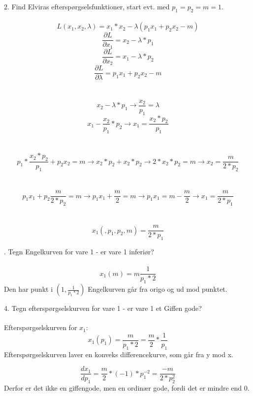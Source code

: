 \documentclass{article}
\begin{document}
2. Find Elviras efterspørgselsfunktioner, start evt. med $p_1 = p_2 = m = 1$.\\ \\
$$L(x_1,x_2,\lambda)=x_1*x_2-\lambda(p_1x_1+p_2x_2-m)$$
$$\frac{\partial L}{\partial x_1}=x_2-\lambda*p_1$$
$$\frac{\partial L}{\partial x_2}=x_1-\lambda*p_2$$
$$\frac{\partial L}{\partial \lambda}=p_1x_1+p_2x_2-m$$
\\ \\
$$x_2-\lambda*p_1\longrightarrow\frac{x_2}{p_1}=\lambda$$
$$x_1-\frac{x_2}{p_1}*p_2\longrightarrow x_1=\frac{x_2*p_2}{p_1}$$ \\ \\
$$p_1*\frac{x_2*p_2}{p_1}+p_2x_2=m\longrightarrow x_2*p_2+x_2*p_2\longrightarrow 2*x_2*p_2=m\longrightarrow x_2=\frac{m}{2*p_2}$$
\\\\
$$p_1x_1+p_2\frac{m}{2*p_2}=m\longrightarrow p_1x_1+\frac{m}{2}=m\longrightarrow p_1x_1=m-\frac{m}{2}\longrightarrow x_1=\frac{m}{2*p_1}$$ \\ \\

$$x_1(,p_1,p_2,m)=\frac{m}{2*p_1}$$


. Tegn Engelkurven for vare 1 - er vare 1 inferiør?\\ \\
$$x_1(m)=m\frac{1}{p_1*2}$$
Den har punkt i $(1,\frac{1}{p_1*2})$ Engelkurven går fra origo og ud mod punktet.



4. Tegn efterspørgselskurven for vare 1 - er vare 1 et Giffen gode?\\ \\
Efterspørgselskurven for $x_1$: \\
$$x_1(p_1)=\frac{m}{p_1*2}=\frac{m}{2}*\frac{1}{p_1}$$
Efterspørgselskurven laver en konveks differencekurve, som går fra y mod x.

$$\frac{dx_1}{dp_1}=\frac{m}{2}*(-1)*p_1^{-2}=\frac{-m}{2*p_2^2}$$
Derfor er det ikke en giffengode, men en ordinær gode, fordi det er mindre end 0.
\end{document}
